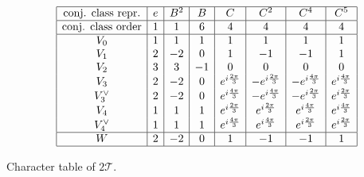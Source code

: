             \begin{table}[H]
                \centering
                {\small
                \begin{equation*}
                        \begin{array}{|c|c|c|c|c|c|c|c|}
                            \hline
                            \text{conj. class repr.} & e & B^2 & B & C & C^2 & C^4 & C^5 \\ \hline
                            \text{conj. class order} & 1 & 1 & 6 & 4 & 4 & 4 & 4\\
                            \hline
                            V_0 & 1 & 1 & 1 & 1 & 1 & 1 & 1 \\
                            V_1 & 2 & -2 & 0 & 1 & -1 & -1 & 1 \\
                            V_2 & 3 & 3 & -1 & 0 & 0 & 0 & 0 \\
                            V_3 & 2 & -2 & 0 & e^{i\frac{2\pi}{3}} & -e^{i\frac{2\pi}{3}} & -e^{i\frac{4\pi}{3}} & e^{i\frac{4\pi}{3}} \\
                            V_3^{\lor} & 2 & -2 & 0 & e^{i\frac{4\pi}{3}} & -e^{i\frac{4\pi}{3}} & -e^{i\frac{2\pi}{3}} & e^{i\frac{2\pi}{3}} \\
                            V_4 & 1 & 1 & 1 & e^{i\frac{2\pi}{3}} & e^{i\frac{2\pi}{3}} & e^{i\frac{4\pi}{3}} & e^{i\frac{4\pi}{3}} \\
                            V_4^{\lor} & 1 & 1 & 1 & e^{i\frac{4\pi}{3}} & e^{i\frac{4\pi}{3}} & e^{i\frac{2\pi}{3}} & e^{i\frac{2\pi}{3}} \\ \hline
                            W & 2 & -2 & 0 & 1 & -1 & -1 & 1 \\ \hline
                        \end{array}
                    \end{equation*}}
                \caption{Character table of $2\mathcal{T}$.}
            \end{table}

